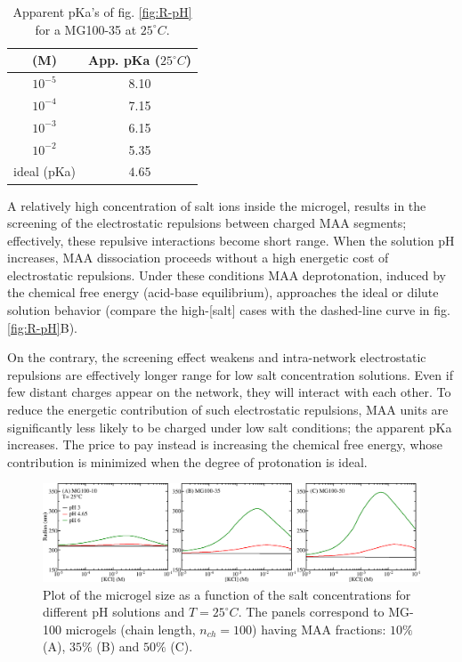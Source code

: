 \begin{table}[!htb]
\small
  \begin{tabular}{|cc|}
    \hline
      [salt] (M)& App. pKa ($25 ^\circ C$)  \\
      \hline
    $10^{-5}$ & 8.10  \\
    $10^{-4}$ & 7.15 \\
    $10^{-3}$ & 6.15 \\
    $10^{-2}$ & 5.35 \\
    ideal (pKa) &  $4.65$  \\
    \hline
  \end{tabular}
 \caption{Apparent pKa's of fig. \ref{fig:R-pH} for a MG100-35 at $25 ^\circ C$.}
\label{table:pKa_app} 
\end{table}



A relatively high concentration of salt ions inside the microgel, results in the screening of the electrostatic repulsions between charged MAA segments;
effectively, these repulsive interactions become short range.
When the solution pH increases, MAA dissociation proceeds without a high energetic cost of electrostatic repulsions.
Under these conditions MAA deprotonation, induced by the chemical free energy (acid-base equilibrium), approaches the ideal or dilute solution behavior (compare the high-[salt] cases with the dashed-line curve in fig. \ref{fig:R-pH}B).



On the contrary, the screening effect weakens and intra-network electrostatic repulsions are effectively longer range for low salt concentration solutions.
Even if few distant charges appear on the network, they will interact with each other.
To reduce the energetic contribution of such electrostatic repulsions, MAA units are significantly less likely to be charged under low salt conditions;
the apparent pKa increases.
The price to pay instead is increasing the chemical free energy, whose contribution is minimized when the degree of protonation is ideal.


\begin{figure}[!htb]
	\centering
	\includegraphics[width=1\linewidth]{Figures/graph-gel/R-cs.png}
	\caption{Plot of the microgel size as a function of the salt concentrations for different pH solutions and $T=25 ^\circ C$.
		The panels correspond to MG-100 microgels (chain length, $n_{ch}=100$) having MAA fractions: $10\%$ (A), $35\%$ (B) and $50\%$ (C).}
	\label{fig:R-cs}
\end{figure}




